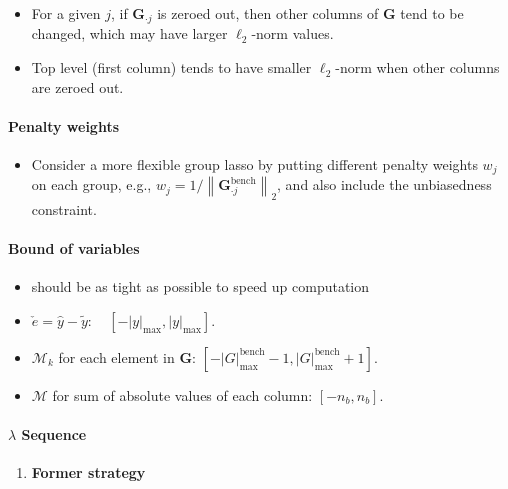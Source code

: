 \documentclass[
  letterpaper,
  DIV=11,
  numbers=noendperiod]{scrartcl}
\let\oldparagraph\paragraph
\renewcommand{\paragraph}[1]{\oldparagraph{#1}\mbox{}}
\providecommand{\tightlist}{%
  \setlength{\itemsep}{0pt}\setlength{\parskip}{0pt}}\usepackage{longtable,booktabs,array}
\begin{document}
\begin{itemize}
\tightlist
\item
  For a given \(j\), if \(\boldsymbol{G}_{\cdot j}\) is zeroed out, then
  other columns of \(\boldsymbol{G}\) tend to be changed, which may have
  larger \(\ell_2\)-norm values.
\item
  Top level (first column) tends to have smaller \(\ell_2\)-norm when
  other columns are zeroed out.
\end{itemize}

\hypertarget{penalty-weights}{%
\paragraph{Penalty weights}\label{penalty-weights}}

\begin{itemize}
\tightlist
\item
  Consider a more flexible group lasso by putting different penalty
  weights \(w_j\) on each group, e.g.,
  \(w_j = 1/\left\|\boldsymbol{G}_{\cdot j}^{\text{bench}}\right\|_2\),
  and also include the unbiasedness constraint.
\end{itemize}

\hypertarget{bound-of-variables}{%
\paragraph{Bound of variables}\label{bound-of-variables}}

\begin{itemize}
\tightlist
\item
  should be as tight as possible to speed up computation
\item
  \(\check{e} = \hat{y} - \tilde{y}: \quad [-|y|_{\max}, |y|_{\max}]\).
\item
  \(\mathcal{M}_k\) for each element in \(\boldsymbol{G}\):
  \([-|G|_{\max}^{\text{bench}} - 1, |G|_{\max}^{\text{bench}} + 1]\).
\item
  \(\mathcal{M}\) for sum of absolute values of each column:
  \([-n_b, n_b]\).
\end{itemize}

\hypertarget{lambda-sequence}{%
\paragraph{\texorpdfstring{\(\lambda\)
Sequence}{\textbackslash lambda Sequence}}\label{lambda-sequence}}

\begin{enumerate}
\def\labelenumi{\arabic{enumi}.}
\tightlist
\item
  \textbf{Former strategy}
\end{enumerate}
\end{document}
